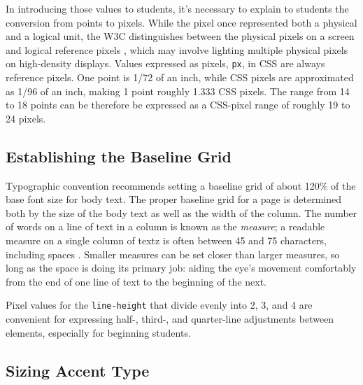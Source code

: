 \documentclass[sigconf,sigplan,review,anonymous]{acmart}
\begin{document}
In introducing those values to students, it’s necessary to explain to students the conversion from points to pixels. While the pixel once represented both a physical and a logical unit, the W3C distinguishes between the physical pixels on a screen and logical reference pixels \cite[§~5.2]{w3c:values}, which may involve lighting multiple physical pixels on high-density displays. Values expressed as pixels, \verb|px|, in CSS are always reference pixels. One point is 1/72 of an inch, while CSS pixels are approximated as 1/96 of an inch, making 1 point roughly 1.333 CSS pixels. The range from 14 to 18 points can be therefore be expressed as a CSS-pixel range of roughly 19 to 24 pixels.

\subsection{Establishing the Baseline Grid}

Typographic convention recommends setting a baseline grid of about 120\% of the base font size for body text. The proper baseline grid for a page is determined both by the size of the body text as well as the width of the column. The number of words on a line of text in a column is known as the {\itshape measure}; a readable measure on a single column of textz is often between 45 and 75 characters, including spaces \cite[pp. 26–27]{rb:style}. Smaller measures can be set closer than larger measures, so long as the space is doing its primary job: aiding the eye's movement comfortably from the end of one line of text to the beginning of the next.

Pixel values for the \verb|line-height| that divide evenly into 2, 3, and 4 are convenient for  expressing half-, third-, and quarter-line adjustments between elements, especially for beginning students.

\subsection{Sizing Accent Type}
\end{document}
